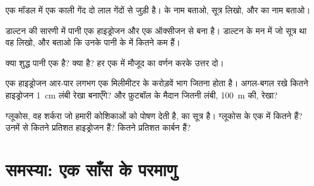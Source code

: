 \begin{exercise}[$\star\star$]\label{exo:g7:atoms-and-molecules:8}
एक मॉडल में एक काली गेंद दो लाल गेंदों से जुड़ी है।  के नाम बताओ,
सूत्र लिखो, और  का नाम बताओ।
\end{exercise}

\begin{exercise}[$\star\star$]\label{exo:g7:atoms-and-molecules:9}
डाल्टन की सारणी में पानी एक हाइड्रोजन  और एक ऑक्सीजन  से बना
है। डाल्टन के मन में जो सूत्र था वह लिखो, और बताओ कि उनके पानी के  में
कितने  कम हैं।
\end{exercise}

\begin{exercise}[$\star\star$]\label{exo:g7:atoms-and-molecules:10}
क्या शुद्ध पानी एक  है? क्या  है? हर एक में मौजूद  का
वर्णन करके उत्तर दो।
\end{exercise}

\begin{exercise}[$\star\star\star$]\label{exo:g7:atoms-and-molecules:11}
एक हाइड्रोजन  आर-पार लगभग एक मिलीमीटर के करोड़वें भाग जितना होता है।
अगल-बगल रखे कितने हाइड्रोजन  \qty{1}{cm} लंबी रेखा बनाएँगे?
और फ़ुटबॉल के मैदान जितनी लंबी, \qty{100}{m} की, रेखा?
\end{exercise}

\begin{exercise}[$\star\star\star$]\label{exo:g7:atoms-and-molecules:12}
ग्लूकोस, वह शर्करा जो हमारी कोशिकाओं को पोषण देती है, का सूत्र
 है। ग्लूकोस के एक  में कितने  हैं? उनमें से कितने
प्रतिशत हाइड्रोजन  हैं? कितने प्रतिशत कार्बन  हैं?
\end{exercise}

\section{समस्या: एक साँस के परमाणु}

